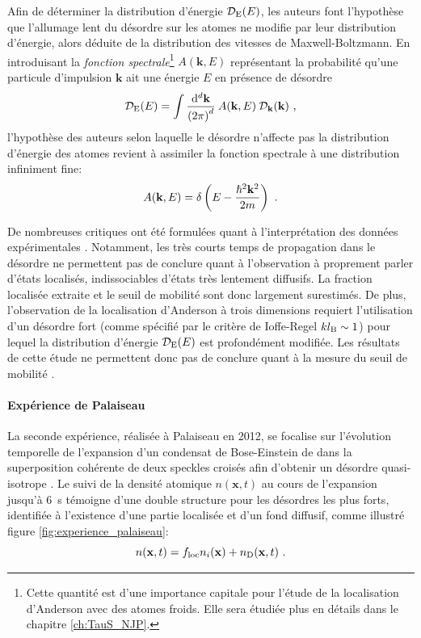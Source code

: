 Afin de déterminer la distribution d'énergie $\mathcal{D}_{\mathrm{E}}(E)$, les auteurs font l'hypothèse que l'allumage lent du désordre sur les atomes ne modifie par leur distribution d'énergie, alors déduite de la distribution des vitesses de Maxwell-Boltzmann. En introduisant la \emph{fonction spectrale}\footnote{Cette quantité est d'une importance capitale pour l'étude de la localisation d'Anderson avec des atomes froids. Elle sera étudiée plus en détails dans le chapitre \ref{ch:TauS_NJP}.} $A(\mathbf{k},E)$ représentant la probabilité qu'une particule d'impulsion $\mathbf{k}$ ait une énergie $E$ en présence de désordre
\begin{equation}
\mathcal{D}_{\mathrm{E}}(E)= \int{\frac{\mathrm{d}^d \mathbf{k}}{{(2 \pi)}^d} \: A(\mathbf{k},E) \: \mathcal{D}_{\mathbf{k}}(\mathbf{k})} \text{ ,}
\label{eq:fonction_spectrale}
\end{equation}
l'hypothèse des auteurs selon laquelle le désordre n'affecte pas la distribution d'énergie des atomes revient à assimiler la fonction spectrale à une distribution infiniment fine:
\begin{equation}
A(\mathbf{k},E) = \delta\left(E- \frac{\hslash^2 \mathbf{k}^2}{2m}\right) \text{ .}
\label{eq:hypothese_urbana_champaign}
\end{equation}

De nombreuses critiques ont été formulées quant à l'interprétation des données expérimentales \citep{muller2014comment}. Notamment, les très courts temps de propagation dans le désordre ne permettent pas de conclure quant à l'observation à proprement parler d'états localisés, indissociables d'états très lentement diffusifs. La fraction localisée extraite et le seuil de mobilité sont donc largement surestimés. De plus, l'observation de la localisation d'Anderson à trois dimensions requiert l'utilisation d'un désordre fort (comme spécifié par le critère de Ioffe-Regel $kl_{\mathrm{B}}\sim 1$) pour lequel la distribution d'énergie $\mathcal{D}_{\mathrm{E}}(E)$ est profondément modifiée. Les résultats de cette étude ne permettent donc pas de conclure quant à la mesure du seuil de mobilité \citep{pasek2017anderson}.



\paragraph*{Expérience de Palaiseau}
La seconde expérience, réalisée à Palaiseau en 2012, se focalise sur l'évolution temporelle de l'expansion d'un condensat de Bose-Einstein de  dans la superposition cohérente de deux speckles croisés afin d'obtenir un désordre quasi-isotrope \citep{jendrzejewski2012three}. Le suivi de la densité atomique $n(\mathbf{x},t)$ au cours de l'expansion jusqu'à \SI{6}{\second} témoigne d'une double structure pour les désordres les plus forts, identifiée à l'existence d'une partie localisée et d'un fond diffusif, comme illustré figure \ref{fig:experience_palaiseau}:
\begin{equation}
n(\mathbf{x},t)= f_{\mathrm{loc}} n_i(\mathbf{x}) + n_{\mathrm{D}}(\mathbf{x},t) \text{ .}
\end{equation}


